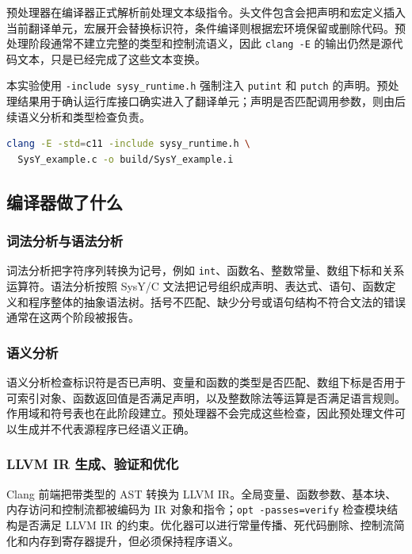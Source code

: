 \documentclass[a4paper]{article}
\begin{document}
预处理器在编译器正式解析前处理文本级指令。头文件包含会把声明和宏定义插入当前翻译单元，宏展开会替换标识符，条件编译则根据宏环境保留或删除代码。预处理阶段通常不建立完整的类型和控制流语义，因此 \texttt{clang -E} 的输出仍然是源代码文本，只是已经完成了这些文本变换。

本实验使用 \texttt{-include sysy\_runtime.h} 强制注入 \texttt{putint} 和 \texttt{putch} 的声明。预处理结果用于确认运行库接口确实进入了翻译单元；声明是否匹配调用参数，则由后续语义分析和类型检查负责。

\begin{lstlisting}[language=bash,caption={观察预处理阶段}]
clang -E -std=c11 -include sysy_runtime.h \
  SysY_example.c -o build/SysY_example.i
\end{lstlisting}

\subsection{编译器做了什么}

\subsubsection{词法分析与语法分析}

词法分析把字符序列转换为记号，例如 \texttt{int}、函数名、整数常量、数组下标和关系运算符。语法分析按照 SysY/C 文法把记号组织成声明、表达式、语句、函数定义和程序整体的抽象语法树。括号不匹配、缺少分号或语句结构不符合文法的错误通常在这两个阶段被报告。

\subsubsection{语义分析}

语义分析检查标识符是否已声明、变量和函数的类型是否匹配、数组下标是否用于可索引对象、函数返回值是否满足声明，以及整数除法等运算是否满足语言规则。作用域和符号表也在此阶段建立。预处理器不会完成这些检查，因此预处理文件可以生成并不代表源程序已经语义正确。

\subsubsection{LLVM IR 生成、验证和优化}

Clang 前端把带类型的 AST 转换为 LLVM IR。全局变量、函数参数、基本块、内存访问和控制流都被编码为 IR 对象和指令；\texttt{opt -passes=verify} 检查模块结构是否满足 LLVM IR 的约束。优化器可以进行常量传播、死代码删除、控制流简化和内存到寄存器提升，但必须保持程序语义\cite{llvmLangRef}。
\end{document}
